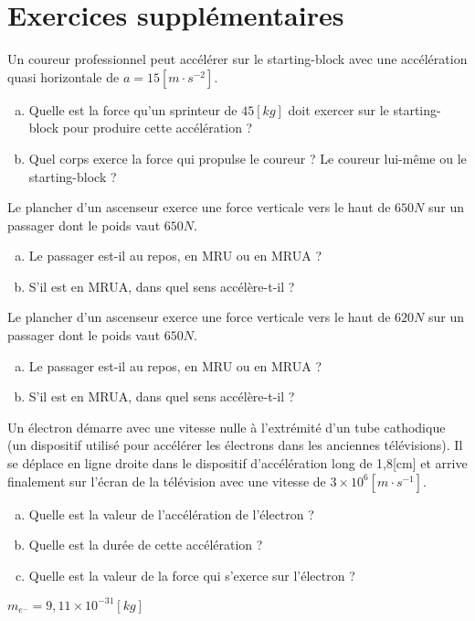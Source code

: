 \section{Exercices supplémentaires}
\begin{exercise}
    Un coureur professionnel peut accélérer sur le starting-block avec une accélération quasi horizontale de \(a=15\unit{[m\cdot s^{-2}]}\).
    \begin{enumerate}[a)]
        \item Quelle est la force qu'un sprinteur de \(45\unit{[kg]}\)  doit exercer sur le starting-block pour produire cette accélération ?
        \item Quel corps exerce la force qui propulse le coureur ? Le coureur lui-même ou le starting-block ?
    \end{enumerate}

\end{exercise}

\begin{exercise}
    Le plancher d'un ascenseur exerce une force verticale vers le haut de \(650 \unit{N}\) sur un passager dont le poids vaut \(650 \unit{N}\).
    \begin{enumerate}[a)]
        \item Le passager est-il au repos, en MRU ou en MRUA ?
        \item S'il est en MRUA, dans quel sens accélère-t-il ?
    \end{enumerate}
\end{exercise}

\begin{exercise}
    Le plancher d'un ascenseur exerce une force verticale vers le haut de \(620 \unit{N}\) sur un passager dont le poids vaut \(650 \unit{N}\).
    \begin{enumerate}[a)]
        \item Le passager est-il au repos, en MRU ou en MRUA ?
        \item S'il est en MRUA, dans quel sens accélère-t-il ?
    \end{enumerate}
\end{exercise}

\begin{exercise}
    Un électron démarre avec une vitesse nulle à l'extrémité d'un tube cathodique (un dispositif utilisé pour accélérer les électrons dans les anciennes télévisions). Il se déplace en ligne droite dans le dispositif d'accélération long de 1,8[cm] et arrive finalement sur l'écran de la télévision avec une vitesse de \(3 \times 10^{6}[m \cdot s^{-1}]\).
    \begin{enumerate}[a)]
        \item Quelle est la valeur de l'accélération de l'électron ?
        \item Quelle est la durée de cette accélération ?
        \item Quelle est la valeur de la force qui s'exerce sur l'électron ?
    \end{enumerate}
    \(m_{e^-}=9,11 \times 10^{-31}[kg]\)
\end{exercise}

